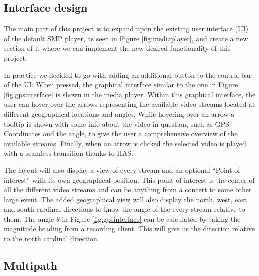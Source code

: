\documentclass[9pt,a4paper]{acmproc}
\begin{document}
\subsection{Interface design}
The main part of this project is to expand upon the existing user interface (UI) of the default SMP player, as seen in Figure \ref{fig:mediaplayer}, and create a new section of it where we can implement the new desired functionality of this project. 

In practice we decided to go with adding an additional button to the control bar of the UI. When pressed, the graphical interface similar to the one in Figure \ref{fig:gpsinterface} is shown in the media player. Within this graphical interface, the user can hover over the arrows representing the available video streams located at different geographical locations and angles. While hovering over an arrow a tooltip is shown with some info about the video in question, such as GPS Coordinates and the angle, to give the user a comprehensive overview of the available streams. Finally, when an arrow is clicked the selected video is played with a seamless transition thanks to HAS.

The layout will also display a view of every stream and an optional “Point of interest” with its own geographical position. This point of interest is the center of all the different video streams and can be anything from a concert to some other large event. The added geographical view will also display the north, west, east and south cardinal directions to know the angle of the every stream relative to them. The angle $\theta$ in Figure \ref{fig:gpsinterface} can be calculated by taking the magnitude heading from a recording client. This will give us the direction relative to the north cardinal direction.

\subsection{Multipath}
\end{document}
